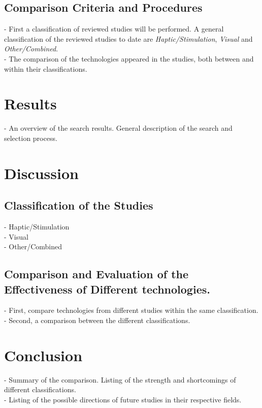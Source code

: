 \documentclass[sigconf]{acmart}
\begin{document}
\subsection{Comparison Criteria and Procedures}
- First a classification of reviewed studies will be performed. A general classification of the reviewed studies to date are \textit{Haptic/Stimulation}\cite{10.1145/3478110}, \textit{Visual}\cite{10.1145/2669485.2669514} and \textit{Other/Combined}\cite{10.1145/3474349.3480205}.\\
- The comparison of the technologies appeared in the studies, both between and within their classifications.

\section{Results}

- An overview of the search results. General description of the search and selection process.

\section{Discussion}
\subsection{Classification of the Studies}
- Haptic/Stimulation\\
- Visual\\
- Other/Combined\\

\subsection{Comparison and Evaluation of the Effectiveness of Different technologies.}
- First, compare technologies from different studies within the same classification.\\
- Second, a comparison between the different classifications.

\section{Conclusion}

- Summary of the comparison. Listing of the strength and shortcomings of different classifications.\\
- Listing of the possible directions of future studies in their respective fields.




\end{document}
